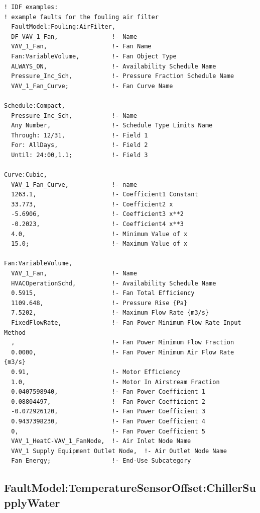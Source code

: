 \begin{lstlisting}
! IDF examples:
! example faults for the fouling air filter
  FaultModel:Fouling:AirFilter,
  DF_VAV_1_Fan,               !- Name
  VAV_1_Fan,                  !- Fan Name
  Fan:VariableVolume,         !- Fan Object Type
  ALWAYS_ON,                  !- Availability Schedule Name
  Pressure_Inc_Sch,           !- Pressure Fraction Schedule Name
  VAV_1_Fan_Curve;            !- Fan Curve Name

Schedule:Compact,
  Pressure_Inc_Sch,           !- Name
  Any Number,                 !- Schedule Type Limits Name
  Through: 12/31,             !- Field 1
  For: AllDays,               !- Field 2
  Until: 24:00,1.1;           !- Field 3

Curve:Cubic,
  VAV_1_Fan_Curve,            !- name
  1263.1,                     !- Coefficient1 Constant
  33.773,                     !- Coefficient2 x
  -5.6906,                    !- Coefficient3 x**2
  -0.2023,                    !- Coefficient4 x**3
  4.0,                        !- Minimum Value of x
  15.0;                       !- Maximum Value of x

Fan:VariableVolume,
  VAV_1_Fan,                  !- Name
  HVACOperationSchd,          !- Availability Schedule Name
  0.5915,                     !- Fan Total Efficiency
  1109.648,                   !- Pressure Rise {Pa}
  7.5202,                     !- Maximum Flow Rate {m3/s}
  FixedFlowRate,              !- Fan Power Minimum Flow Rate Input Method
  ,                           !- Fan Power Minimum Flow Fraction
  0.0000,                     !- Fan Power Minimum Air Flow Rate {m3/s}
  0.91,                       !- Motor Efficiency
  1.0,                        !- Motor In Airstream Fraction
  0.0407598940,               !- Fan Power Coefficient 1
  0.08804497,                 !- Fan Power Coefficient 2
  -0.072926120,               !- Fan Power Coefficient 3
  0.9437398230,               !- Fan Power Coefficient 4
  0,                          !- Fan Power Coefficient 5
  VAV_1_HeatC-VAV_1_FanNode,  !- Air Inlet Node Name
  VAV_1 Supply Equipment Outlet Node,  !- Air Outlet Node Name
  Fan Energy;                 !- End-Use Subcategory
\end{lstlisting}

\subsection{FaultModel:TemperatureSensorOffset:ChillerSupplyWater}\label{faultmodeltemperaturesensoroffsetchillersupplywater}

